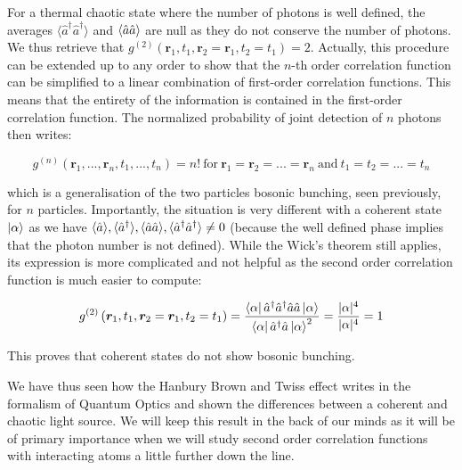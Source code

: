 \noindent For a thermal chaotic state where the number of photons is well defined, the averages $\langle \hat{a}^{\dagger} \hat{a}^{\dagger} \rangle$ and $\langle\hat{a} \hat{a}\rangle$ are null as they do not conserve the number of photons. We thus retrieve that $g^{(2)}\left(\bm{r}_{1}, t_{1}, \bm{r}_{2}=\bm{r}_1, t_{2}=t_1\right)=2$. Actually, this procedure can be extended up to any order to show that the $n$-th order correlation function can be simplified to a linear combination of first-order correlation functions. This means that the entirety of the information is contained in the first-order correlation function. The normalized probability of joint detection of $n$ photons then writes:

\begin{equation}
    g^{(n)} (\bm{r}_1,...,\bm{r}_n,t_1,...,t_n) = n! \ \mathrm{for} \ \bm{r}_1=\bm{r}_2= ... =\bm{r}_n \ \mathrm{and} \ t_1=t_2=...=t_n
\end{equation}

\noindent which is a generalisation of the two particles bosonic bunching, seen previously, for $n$ particles. Importantly, the situation is very different with a coherent state $\ket{\alpha}$ as we have $\langle \hat{a} \rangle, \langle \hat{a}^{\dagger} \rangle, \langle\hat{a} \hat{a}\rangle, \langle \hat{a}^{\dagger} \hat{a}^{\dagger} \rangle \neq 0$ (because the well defined phase implies that the photon number is not defined). While the Wick's theorem still applies, its expression is more complicated and not helpful as the second order correlation function is much easier to compute:


\begin{equation}
     g^{(2)}\left(\bm{r}_{1}, t_{1}, \bm{r}_{2}=\bm{r}_1, t_{2}=t_1\right) = \frac{\bra{\alpha} \hat{a}^{\dagger} \hat{a}^{\dagger} \hat{a} \hat{a} \ket{\alpha}} {\bra{\alpha} \hat{a}^{\dagger} \hat{a} \ket{\alpha}^{2}} = \frac{|\alpha|^4}{|\alpha|^4}=1
\end{equation}

\label{sec:coherent_g2}

\noindent This proves that coherent states do not show bosonic bunching.

We have thus seen how the Hanbury Brown and Twiss effect writes in the formalism of Quantum Optics and shown the differences between a coherent and chaotic light source. We will keep this result in the back of our minds as it will be of primary importance when we will study second order correlation functions with interacting atoms a little further down the line.

